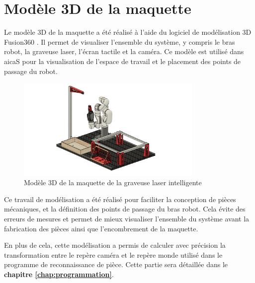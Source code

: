 \section{Modèle 3D de la maquette}

Le modèle 3D de la maquette a été réalisé à l'aide du logiciel de modélisation 3D Fusion360 \cite{Fusion360Docs}. Il permet de visualiser l'ensemble du système, y compris le bras robot, la graveuse laser, l'écran tactile et la caméra. Ce modèle est utilisé dans \gls{aicaS} pour la visualisation de l'espace de travail et le placement des points de passage du robot.

\begin{figure}[H]
    \centering
    \includegraphics[width=0.8\textwidth]{assets/figures/modele_3d.png}
    \caption{Modèle 3D de la maquette de la graveuse laser intelligente}
    \label{fig:maquette_3d}
\end{figure}

Ce travail de modélisation a été réalisé pour faciliter la conception de pièces mécaniques, et la définition des points de passage du bras robot. Cela évite des erreurs de mesures et permet de mieux visualiser l'ensemble du système avant la fabrication des pièces ainsi que l'encombrement de la maquette.

En plus de cela, cette modélisation a permis de calculer avec précision la transformation entre le repère caméra et le repère monde utilisé dans le programme de reconnaissance de pièce. Cette partie sera détaillée dans le \textbf{chapitre \ref{chap:programmation}}.
